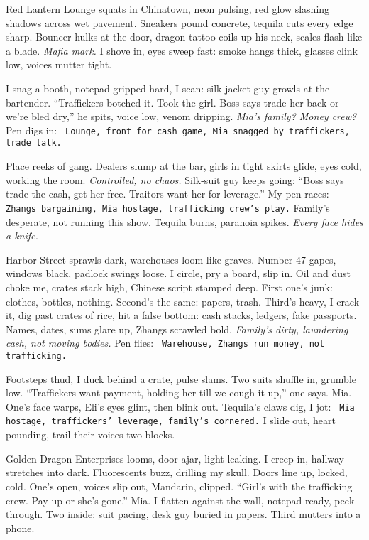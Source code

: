 \documentclass[12pt]{article}
\newcommand{\note}[1]{\texttt{\small \color{DarkGray} #1}}
\begin{document}
Red Lantern Lounge squats in Chinatown, neon pulsing, red glow slashing shadows across wet pavement. Sneakers pound concrete, tequila cuts every edge sharp. Bouncer hulks at the door, dragon tattoo coils up his neck, scales flash like a blade. \textit{Mafia mark.} I shove in, eyes sweep fast: smoke hangs thick, glasses clink low, voices mutter tight.

I snag a booth, notepad gripped hard, I scan: silk jacket guy growls at the bartender. “Traffickers botched it. Took the girl. Boss says trade her back or we’re bled dry,” he spits, voice low, venom dripping. \textit{Mia’s family? Money crew?} Pen digs in: \note{Lounge, front for cash game, Mia snagged by traffickers, trade talk.}

Place reeks of gang. Dealers slump at the bar, girls in tight skirts glide, eyes cold, working the room. \textit{Controlled, no chaos.} Silk-suit guy keeps going: “Boss says trade the cash, get her free. Traitors want her for leverage.” My pen races: \note{Zhangs bargaining, Mia hostage, trafficking crew’s play.} Family’s desperate, not running this show. Tequila burns, paranoia spikes. \textit{Every face hides a knife.}

Harbor Street sprawls dark, warehouses loom like graves. Number 47 gapes, windows black, padlock swings loose. I circle, pry a board, slip in. Oil and dust choke me, crates stack high, Chinese script stamped deep. First one’s junk: clothes, bottles, nothing. Second’s the same: papers, trash. Third’s heavy, I crack it, dig past crates of rice, hit a false bottom: cash stacks, ledgers, fake passports. Names, dates, sums glare up, Zhangs scrawled bold. \textit{Family’s dirty, laundering cash, not moving bodies.} Pen flies: \note{Warehouse, Zhangs run money, not trafficking.}

Footsteps thud, I duck behind a crate, pulse slams. Two suits shuffle in, grumble low. “Traffickers want payment, holding her till we cough it up,” one says. \textnormal{Mia}. One’s face warps, \textnormal{Eli}’s eyes glint, then blink out. Tequila’s claws dig, I jot: \note{Mia hostage, traffickers’ leverage, family’s cornered.} I slide out, heart pounding, trail their voices two blocks.

Golden Dragon Enterprises looms, door ajar, light leaking. I creep in, hallway stretches into dark. Fluorescents buzz, drilling my skull. Doors line up, locked, cold. One’s open, voices slip out, Mandarin, clipped. “Girl’s with the trafficking crew. Pay up or she’s gone.” \textnormal{Mia}. I flatten against the wall, notepad ready, peek through. Two inside: suit pacing, desk guy buried in papers. Third mutters into a phone.
\end{document}

